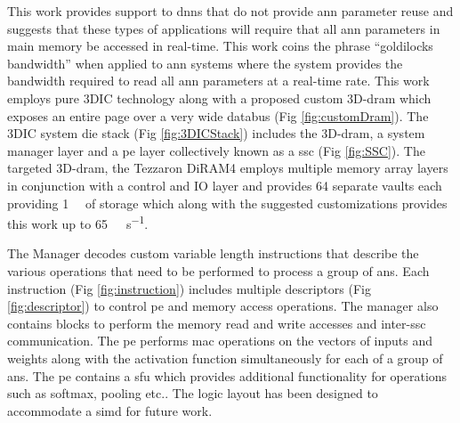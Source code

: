 \documentclass[journal]{IEEEtran}
\begin{document}
\iffalse
This work demonstrates how a customized \acf{3ddram} with a very wide databus can be combined with application-specific layers to produce a system meeting the requirements of embedded systems employing multiple instances of disparate \acfp{ann}.
\fi
\iffalse
This work avoids any dependencies on \ac{sram} that might limit the size or type of \acp{ann} and demonstrates the required utilization of the very wide \ac{dram} databus.
By employing instructions and data structures that facilitate operating directly out of the \ac{3ddram}, 
and allowing system functions to operate asynchronously, 
this work is able to absorb the latencies associated with \ac{dram} and utilize the wide databus of a customized \ac{dram} to provide the bandwidth required to support multiple useful-sized disparate \acp{ann}.
This work demonstrates a near-memory system that does not simply add \ac{ann} processing as an appendage to an existing \ac{3ddram} but proposes customizations to an existing \ac{3ddram} along with tight integration of the \ac{ann} processing elements and memory controller to 
create a true near-memory \ac{ann} accelerator.
\fi
This work provides support to \acp{dnn} that do not provide \ac{ann} parameter reuse \iffalse\cite{coates2013deep}\fi and suggests that these types of applications will require that all \ac{ann} parameters in main memory be accessed in real-time.
This work coins the phrase ``goldilocks bandwidth'' when applied to \ac{ann} systems where the system provides the bandwidth required to read all \ac{ann} parameters at a real-time rate\iffalse of \SI{16}{\milli\second}\fi. 
This work employs pure 3DIC technology along with a proposed custom 3D-\ac{dram} which exposes an entire page over a very wide databus (Fig \ref{fig:customDram}).
The 3DIC system die stack (Fig \ref{fig:3DICStack}) includes the 3D-\ac{dram}, a system manager layer and a \ac{pe} layer collectively known as a \ac{ssc} (Fig \ref{fig:SSC}).
The targeted 3D-\ac{dram}, the Tezzaron DiRAM4\cite{tezzaron:diram4} employs multiple memory array layers in conjunction with a control and IO layer and provides 64 separate vaults each providing \SI{1}{\giga\bit} of storage which along with the suggested customizations provides this work up to \SI[per-mode=symbol]{65}{\tera\bit\per\second}.

The Manager decodes custom variable length instructions that describe the various operations that need to be performed to process a group of \acp{an}. Each instruction (Fig \ref{fig:instruction}) includes multiple descriptors (Fig \ref{fig:descriptor}) to control \ac{pe} and memory access operations. The manager also contains blocks to perform the memory read and write accesses and inter-\ac{ssc} communication.
The \ac{pe} performs \ac{mac} operations on the vectors of inputs and weights along with the activation function simultaneously for each of a group of \acp{an}. The \ac{pe} contains a \ac{sfu} which provides additional functionality for operations such as softmax, pooling etc.. The logic layout has been designed to accommodate a \ac{simd} for future work.
\end{document}
